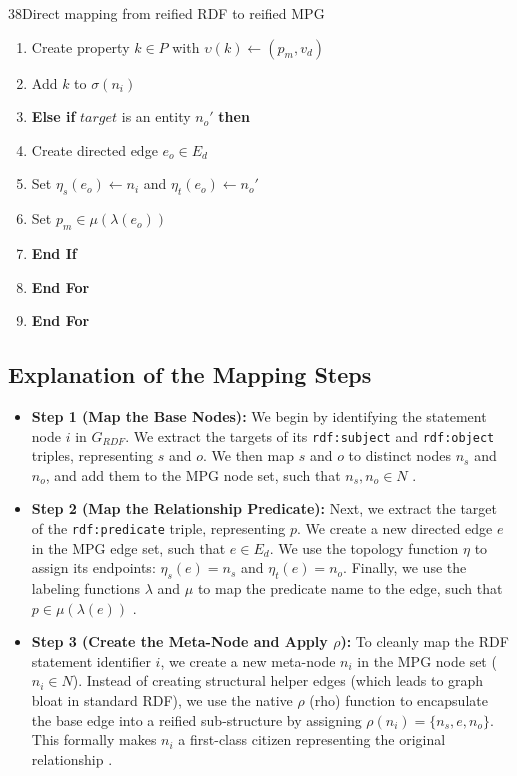 \begin{question}{3}{8}{Direct mapping from reified RDF to reified MPG}
\begin{enumerate}[leftmargin=*, noitemsep, topsep=4pt]
    \item \quad \quad \quad Create property $k \in P$ with $\upsilon(k) \leftarrow (p_m, v_d)$
    \item \quad \quad \quad Add $k$ to $\sigma(n_i)$
    \item \quad \quad \textbf{Else if} $target$ is an entity $n_o'$ \textbf{then}
    \item \quad \quad \quad Create directed edge $e_o \in E_d$
    \item \quad \quad \quad Set $\eta_s(e_o) \leftarrow n_i$ and $\eta_t(e_o) \leftarrow n_o'$
    \item \quad \quad \quad Set $p_m \in \mu(\lambda(e_o))$
    \item \quad \quad \textbf{End If}
    \item \quad \textbf{End For}
    \item \textbf{End For}
\end{enumerate}
\noindent\hrulefill
\vspace{0.5em}

\subsection{Explanation of the Mapping Steps}

\begin{itemize}[leftmargin=*]
    \item \textbf{Step 1 (Map the Base Nodes):} We begin by identifying the statement node $i$ in $G_{RDF}$. We extract the targets of its \texttt{rdf:subject} and \texttt{rdf:object} triples, representing $s$ and $o$. We then map $s$ and $o$ to distinct nodes $n_s$ and $n_o$, and add them to the MPG node set, such that $n_s, n_o \in N$ \cite{hernandez_reifying_nodate, sadoughi_meta-property_2025}.
    
    \item \textbf{Step 2 (Map the Relationship Predicate):} Next, we extract the target of the \texttt{rdf:predicate} triple, representing $p$. We create a new directed edge $e$ in the MPG edge set, such that $e \in E_d$. We use the topology function $\eta$ to assign its endpoints: $\eta_s(e) = n_s$ and $\eta_t(e) = n_o$. Finally, we use the labeling functions $\lambda$ and $\mu$ to map the predicate name to the edge, such that $p \in \mu(\lambda(e))$ \cite{sadoughi_meta-property_2025}.
    
    \item \textbf{Step 3 (Create the Meta-Node and Apply $\rho$):} To cleanly map the RDF statement identifier $i$, we create a new meta-node $n_i$ in the MPG node set ($n_i \in N$). Instead of creating structural helper edges (which leads to graph bloat in standard RDF), we use the native $\rho$ (rho) function to encapsulate the base edge into a reified sub-structure by assigning $\rho(n_i) = \{n_s, e, n_o\}$. This formally makes $n_i$ a first-class citizen representing the original relationship \cite{sadoughi_meta-property_2025}.
    

\end{itemize}
\end{question}
